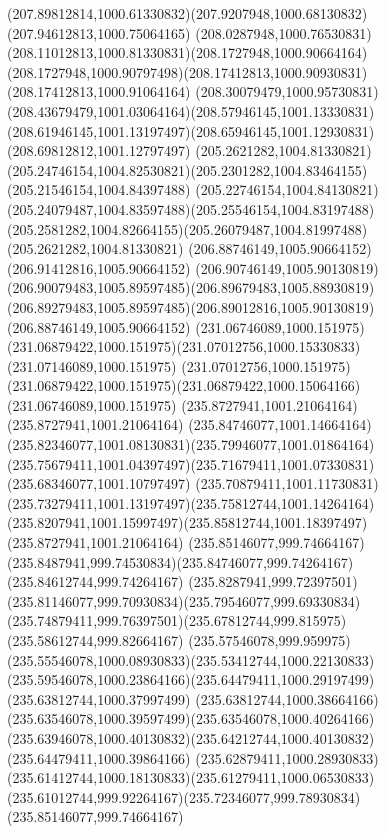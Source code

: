 {{	\curveto(207.89812814,1000.61330832)(207.9207948,1000.68130832)(207.94612813,1000.75064165)
	\curveto(208.0287948,1000.76530831)(208.11012813,1000.81330831)(208.1727948,1000.90664164)
	\curveto(208.1727948,1000.90797498)(208.17412813,1000.90930831)(208.17412813,1000.91064164)
	\curveto(208.30079479,1000.95730831)(208.43679479,1001.03064164)(208.57946145,1001.13330831)
	\curveto(208.61946145,1001.13197497)(208.65946145,1001.12930831)(208.69812812,1001.12797497)
	\moveto(205.2621282,1004.81330821)
	\curveto(205.24746154,1004.82530821)(205.2301282,1004.83464155)(205.21546154,1004.84397488)
	\curveto(205.22746154,1004.84130821)(205.24079487,1004.83597488)(205.25546154,1004.83197488)
	\curveto(205.2581282,1004.82664155)(205.26079487,1004.81997488)(205.2621282,1004.81330821)
	\moveto(206.88746149,1005.90664152)
	\lineto(206.91412816,1005.90664152)
	\curveto(206.90746149,1005.90130819)(206.90079483,1005.89597485)(206.89679483,1005.88930819)
	\curveto(206.89279483,1005.89597485)(206.89012816,1005.90130819)(206.88746149,1005.90664152)
	\moveto(231.06746089,1000.151975)
	\curveto(231.06879422,1000.151975)(231.07012756,1000.15330833)(231.07146089,1000.151975)
	\lineto(231.07012756,1000.151975)
	\curveto(231.06879422,1000.151975)(231.06879422,1000.15064166)(231.06746089,1000.151975)
	\moveto(235.8727941,1001.21064164)
	\lineto(235.8727941,1001.21064164)
	\curveto(235.84746077,1001.14664164)(235.82346077,1001.08130831)(235.79946077,1001.01864164)
	\curveto(235.75679411,1001.04397497)(235.71679411,1001.07330831)(235.68346077,1001.10797497)
	\curveto(235.70879411,1001.11730831)(235.73279411,1001.13197497)(235.75812744,1001.14264164)
	\curveto(235.8207941,1001.15997497)(235.85812744,1001.18397497)(235.8727941,1001.21064164)
	\moveto(235.85146077,999.74664167)
	\curveto(235.8487941,999.74530834)(235.84746077,999.74264167)(235.84612744,999.74264167)
	\curveto(235.8287941,999.72397501)(235.81146077,999.70930834)(235.79546077,999.69330834)
	\curveto(235.74879411,999.76397501)(235.67812744,999.815975)(235.58612744,999.82664167)
	\curveto(235.57546078,999.959975)(235.55546078,1000.08930833)(235.53412744,1000.22130833)
	\curveto(235.59546078,1000.23864166)(235.64479411,1000.29197499)(235.63812744,1000.37997499)
	\curveto(235.63812744,1000.38664166)(235.63546078,1000.39597499)(235.63546078,1000.40264166)
	\curveto(235.63946078,1000.40130832)(235.64212744,1000.40130832)(235.64479411,1000.39864166)
	\curveto(235.62879411,1000.28930833)(235.61412744,1000.18130833)(235.61279411,1000.06530833)
	\curveto(235.61012744,999.92264167)(235.72346077,999.78930834)(235.85146077,999.74664167)
}}
